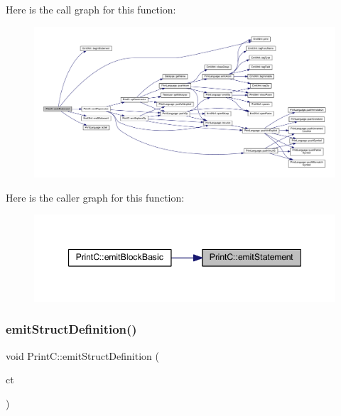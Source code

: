 Here is the call graph for this function\+:
\nopagebreak
\begin{figure}[H]
\begin{center}
\leavevmode
\includegraphics[width=350pt]{class_print_c_a790cee3e0a91933b641ccf0433868ef1_cgraph}
\end{center}
\end{figure}
Here is the caller graph for this function\+:
\nopagebreak
\begin{figure}[H]
\begin{center}
\leavevmode
\includegraphics[width=347pt]{class_print_c_a790cee3e0a91933b641ccf0433868ef1_icgraph}
\end{center}
\end{figure}
\mbox{\label{class_print_c_a680ec03cb56eb70c13c4d1ee261cdda9}} 
\subsubsection{\texorpdfstring{emitStructDefinition()}{emitStructDefinition()}}
{\footnotesize\ttfamily void Print\+C\+::emit\+Struct\+Definition (\begin{DoxyParamCaption}\item[{const \mbox{\hyperlink{class_type_struct}{Type\+Struct}} $\ast$}]{ct }\end{DoxyParamCaption})\hspace{0.3cm}{\ttfamily [protected]}}



